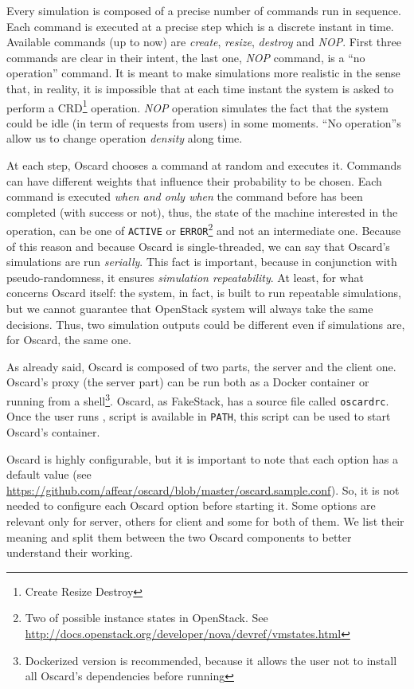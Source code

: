 Every simulation is composed of a precise number of commands run in sequence. Each command is executed at a precise step which is a discrete instant in time. Available commands (up to now) are \textit{create}, \textit{resize}, \textit{destroy} and \textit{NOP}. First three commands are clear in their intent, the last one, \textit{NOP} command, is a ``no operation'' command. It is meant to make simulations more realistic in the sense that, in reality, it is impossible that at each time instant the system is asked to perform a CRD\footnote{Create Resize Destroy} operation. \textit{NOP} operation simulates the fact that the system could be idle (in term of requests from users) in some moments. ``No operation''s allow us to change operation \textit{density} along time.

At each step, Oscard chooses a command at random and executes it. Commands can have different weights that influence their probability to be chosen. Each command is executed \textit{when and only when} the command before has been completed (with success or not), thus, the state of the machine interested in the operation, can be one of \texttt{ACTIVE} or \texttt{ERROR}\footnote{Two of possible instance states in OpenStack. See \url{http://docs.openstack.org/developer/nova/devref/vmstates.html}} and not an intermediate one. Because of this reason and because Oscard is single-threaded, we can say that Oscard's simulations are run \textit{serially}. This fact is important, because in conjunction with pseudo-randomness, it ensures \textit{simulation repeatability}. At least, for what concerns Oscard itself: the system, in fact, is built to run repeatable simulations, but we cannot guarantee that OpenStack system will always take the same decisions. Thus, two simulation outputs could be different even if simulations are, for Oscard, the same one.

As already said, Oscard is composed of two parts, the server and the client one. Oscard's proxy (the server part) can be run both as a Docker container or running  from a shell\footnote{Dockerized version is recommended, because it allows the user not to install all Oscard's dependencies before running}. Oscard, as FakeStack, has a source file called \texttt{oscardrc}. Once the user runs ,  script is available in \texttt{PATH}, this script can be used to start Oscard's container.

Oscard is highly configurable, but it is important to note that each option has a default value (see \url{https://github.com/affear/oscard/blob/master/oscard.sample.conf}). So, it is not needed to configure each Oscard option before starting it. Some options are relevant only for server, others for client and some for both of them. We list their meaning and split them between the two Oscard components to better understand their working.

